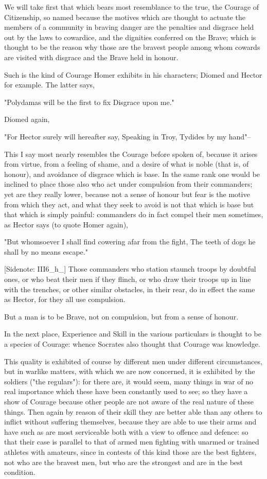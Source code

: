 We will take first that which bears most resemblance to the true, the
Courage of Citizenship, so named because the motives which are thought
to actuate the members of a community in braving danger are the
penalties and disgrace held out by the laws to cowardice, and the
dignities conferred on the Brave; which is thought to be the reason
why those are the bravest people among whom cowards are visited with
disgrace and the Brave held in honour.

Such is the kind of Courage Homer exhibits in his characters; Diomed and
Hector for example. The latter says,

 "Polydamas will be the first to fix
  Disgrace upon me."

Diomed again,

 "For Hector surely will hereafter say,
  Speaking in Troy, Tydides by my hand"--

This I say most nearly resembles the Courage before spoken of, because
it arises from virtue, from a feeling of shame, and a desire of what is
noble (that is, of honour), and avoidance of disgrace which is base. In
the same rank one would be inclined to place those also who act under
compulsion from their commanders; yet are they really lower, because not
a sense of honour but fear is the motive from which they act, and what
they seek to avoid is not that which is base but that which is simply
painful: commanders do in fact compel their men sometimes, as Hector
says (to quote Homer again),

  "But whomsoever I shall find cowering afar from the fight,
  The teeth of dogs he shall by no means escape."

[Sidenote: III6_h_] Those commanders who station staunch troops by
doubtful ones, or who beat their men if they flinch, or who draw their
troops up in line with the trenches, or other similar obstacles,
in their rear, do in effect the same as Hector, for they all use
compulsion.

But a man is to be Brave, not on compulsion, but from a sense of honour.

In the next place, Experience and Skill in the various particulars is
thought to be a species of Courage: whence Socrates also thought that
Courage was knowledge.

This quality is exhibited of course by different men under different
circumstances, but in warlike matters, with which we are now concerned,
it is exhibited by the soldiers ("the regulars"): for there are, it
would seem, many things in war of no real importance which these have
been constantly used to see; so they have a show of Courage because
other people are not aware of the real nature of these things. Then
again by reason of their skill they are better able than any others to
inflict without suffering themselves, because they are able to use their
arms and have such as are most serviceable both with a view to offence
and defence: so that their case is parallel to that of armed men
fighting with unarmed or trained athletes with amateurs, since in
contests of this kind those are the best fighters, not who are the
bravest men, but who are the strongest and are in the best condition.

